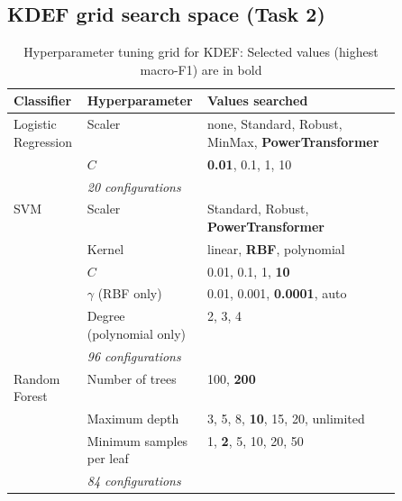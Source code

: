 \FloatBarrier
\subsection{KDEF grid search space (Task 2)}
\label{app:kdef-grid}
\begin{table}[H]\centering\small
\begin{tabular}{@{}llp{0.5\linewidth}@{}}\toprule
Classifier & Hyperparameter & Values searched \\\midrule
Logistic Regression & Scaler & none, Standard, Robust, MinMax, \textbf{PowerTransformer} \\
 & $C$ & \textbf{0.01}, 0.1, 1, 10 \\
 & \multicolumn{2}{l}{\footnotesize\emph{20 configurations}} \\\midrule
SVM & Scaler & Standard, Robust, \textbf{PowerTransformer} \\
 & Kernel & linear, \textbf{RBF}, polynomial \\
 & $C$ & 0.01, 0.1, 1, \textbf{10} \\
 & $\gamma$ (RBF only) & 0.01, 0.001, \textbf{0.0001}, auto \\
 & Degree (polynomial only) & 2, 3, 4 \\
 & \multicolumn{2}{l}{\footnotesize\emph{96 configurations}} \\\midrule
Random Forest & Number of trees & 100, \textbf{200} \\
 & Maximum depth & 3, 5, 8, \textbf{10}, 15, 20, unlimited \\
 & Minimum samples per leaf & 1, \textbf{2}, 5, 10, 20, 50 \\
 & \multicolumn{2}{l}{\footnotesize\emph{84 configurations}} \\
\bottomrule\end{tabular}
\caption{Hyperparameter tuning grid for KDEF: Selected values (highest macro-F1) are in bold}
\label{tab:kdef-grid}
\end{table}

\FloatBarrier

